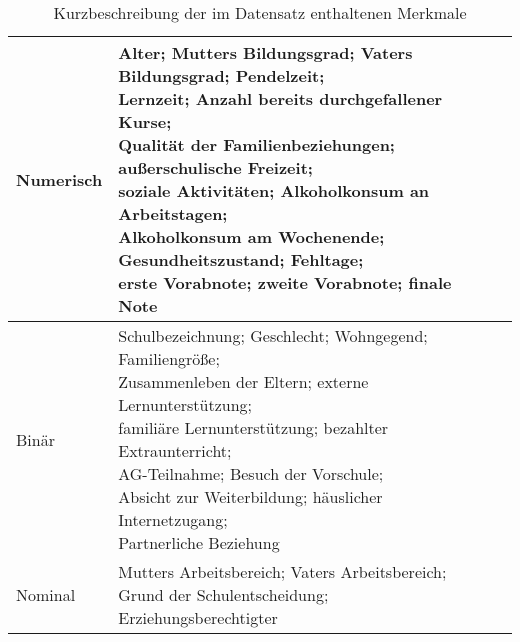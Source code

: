 \begin{table}[htb]
    \centering
    \caption{Kurzbeschreibung der im Datensatz enthaltenen Merkmale}
    \label{tab:Table2.1}
    \begin{tabular}{|l|l|l|}
    \hline
        Numerisch & \makecell[l]{Alter; Mutters Bildungsgrad; Vaters Bildungsgrad; Pendelzeit; \\Lernzeit; Anzahl bereits durchgefallener Kurse; \\Qualität der Familienbeziehungen; außerschulische Freizeit; \\soziale Aktivitäten; Alkoholkonsum an Arbeitstagen; \\Alkoholkonsum am Wochenende; Gesundheitszustand; Fehltage; \\\textbf{erste Vorabnote; zweite Vorabnote; finale Note}} \\ \hline
        Binär & \makecell[l]{Schulbezeichnung; Geschlecht; Wohngegend; Familiengröße; \\Zusammenleben der Eltern; externe Lernunterstützung; \\familiäre Lernunterstützung; bezahlter Extraunterricht; \\AG-Teilnahme; Besuch der Vorschule; \\Absicht zur Weiterbildung; häuslicher Internetzugang; \\Partnerliche Beziehung} \\ \hline
        Nominal & \makecell[l]{Mutters Arbeitsbereich; Vaters Arbeitsbereich; \\Grund der Schulentscheidung; Erziehungsberechtigter} \\ \hline
    \end{tabular}
\end{table}